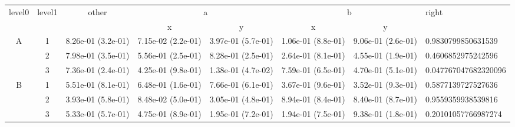 \begin{tabular}{cccccccl}
\toprule
\multirow{2}{*}{level0} & \multirow{2}{*}{level1}& \multirow{2}{*}{other}&\multicolumn{2}{c}{a}&\multicolumn{2}{c}{b}& \multirow{2}{*}{right}\tabularnewline
\cmidrule(lr){4-5}
\cmidrule(lr){6-7}
&&&x&y&x&y\tabularnewline
\midrule
\multirow{3}{*}{A}&1& 8.26e-01 (3.2e-01)& 7.15e-02 (2.2e-01)& 3.97e-01 (5.7e-01)& 1.06e-01 (8.8e-01)& 9.06e-01 (2.6e-01)& 0.9830799850631539\tabularnewline
&2& 7.98e-01 (3.5e-01)& 5.56e-01 (2.5e-01)& 8.28e-01 (2.5e-01)& 2.64e-01 (8.1e-01)& 4.55e-01 (1.9e-01)& 0.4606852975242596\tabularnewline
&3& 7.36e-01 (2.4e-01)& 4.25e-01 (9.8e-01)& 1.38e-01 (4.7e-02)& 7.59e-01 (6.5e-01)& 4.70e-01 (5.1e-01)& 0.047767047682320096\tabularnewline
\midrule
\multirow{3}{*}{B}&1& 5.51e-01 (8.1e-01)& 6.48e-01 (1.6e-01)& 7.66e-01 (6.1e-01)& 3.67e-01 (9.6e-01)& 3.52e-01 (9.3e-01)& 0.5877139727527636\tabularnewline
&2& 3.93e-01 (5.8e-01)& 8.48e-02 (5.0e-01)& 3.05e-01 (4.8e-01)& 8.94e-01 (8.4e-01)& 8.40e-01 (8.7e-01)& 0.9559359938539816\tabularnewline
&3& 5.33e-01 (5.7e-01)& 4.75e-01 (8.9e-01)& 1.95e-01 (7.2e-01)& 1.94e-01 (7.5e-01)& 9.38e-01 (1.8e-01)& 0.20101057766987274\tabularnewline
\bottomrule
\end{tabular}
